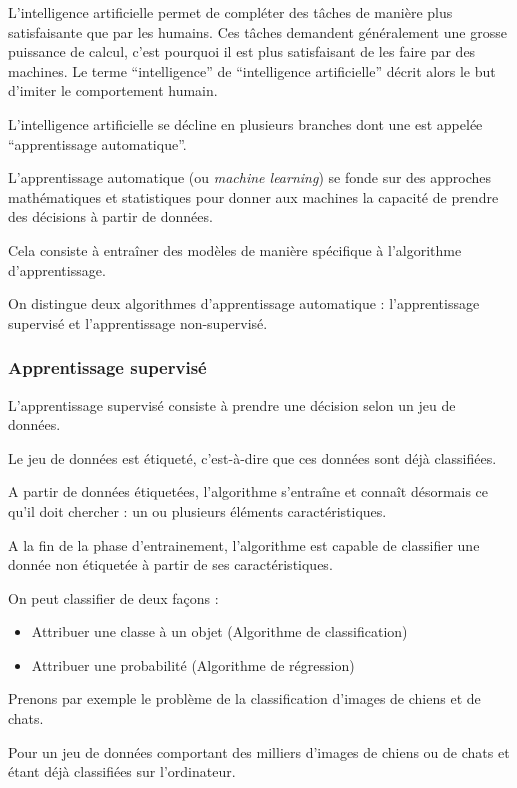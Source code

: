 \documentclass[
12pt,
french,
]{article}
\begin{document}
L'intelligence artificielle permet de compléter des tâches de manière
plus satisfaisante que par les humains. Ces tâches demandent
généralement une grosse puissance de calcul, c'est pourquoi il est plus
satisfaisant de les faire par des machines. Le terme ``intelligence'' de
``intelligence artificielle'' décrit alors le but d'imiter le
comportement humain.

L'intelligence artificielle se décline en plusieurs branches dont une
est appelée ``apprentissage automatique''.

L'apprentissage automatique (ou \emph{machine learning}) se fonde sur
des approches mathématiques et statistiques pour donner aux machines la
capacité de prendre des décisions à partir de données.

Cela consiste à entraîner des modèles de manière spécifique à
l'algorithme d'apprentissage.

On distingue deux algorithmes d'apprentissage automatique :
l'apprentissage supervisé et l'apprentissage non-supervisé.

\hypertarget{apprentissage-supervisuxe9}{%
\subsubsection{Apprentissage
supervisé}\label{apprentissage-supervisuxe9}}

L'apprentissage supervisé consiste à prendre une décision selon un jeu
de données.

Le jeu de données est étiqueté, c'est-à-dire que ces données sont déjà
classifiées.

A partir de données étiquetées, l'algorithme s'entraîne et connaît
désormais ce qu'il doit chercher : un ou plusieurs éléments
caractéristiques.

A la fin de la phase d'entrainement, l'algorithme est capable de
classifier une donnée non étiquetée à partir de ses caractéristiques.

On peut classifier de deux façons :

\begin{itemize}
\item
  Attribuer une classe à un objet (Algorithme de classification)
\item
  Attribuer une probabilité (Algorithme de régression)
\end{itemize}

Prenons par exemple le problème de la classification d'images de chiens
et de chats.

Pour un jeu de données comportant des milliers d'images de chiens ou de
chats et étant déjà classifiées sur l'ordinateur.
\end{document}
